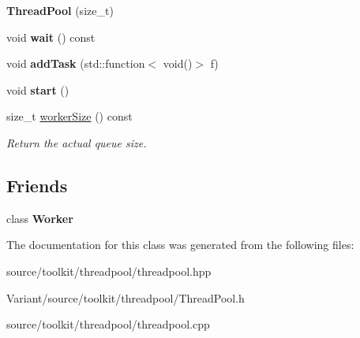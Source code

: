 \begin{DoxyCompactItemize}
\mbox{\label{classThreadPool_ac291710e33dbbed96ee20711080d506d}} 
{\bfseries Thread\+Pool} (size\+\_\+t)
\item 
\mbox{\label{classThreadPool_a8bc38c40ecf3916d28e1e721b4eaa3ac}} 
void {\bfseries wait} () const
\item 
\mbox{\label{classThreadPool_a2e9207443f99bdbebf0f4dd51e8efd69}} 
void {\bfseries add\+Task} (std\+::function$<$ void()$>$ f)
\item 
\mbox{\label{classThreadPool_a74e85ff1e6605531acdd8e0e3cf903df}} 
void {\bfseries start} ()
\item 
\mbox{\label{classThreadPool_acedf753fca0af3a8d23cea609273183c}} 
size\+\_\+t \hyperlink{classThreadPool_acedf753fca0af3a8d23cea609273183c}{worker\+Size} () const
\begin{DoxyCompactList}\small\item\em Return the actual queue size. \end{DoxyCompactList}\end{DoxyCompactItemize}
\subsection*{Friends}
\begin{DoxyCompactItemize}
\item 
\mbox{\label{classThreadPool_ae6071f2a70b19dd2d09379cddb8d6442}} 
class {\bfseries Worker}
\end{DoxyCompactItemize}


The documentation for this class was generated from the following files\+:\begin{DoxyCompactItemize}
\item 
source/toolkit/threadpool/threadpool.\+hpp\item 
Variant/source/toolkit/threadpool/Thread\+Pool.\+h\item 
source/toolkit/threadpool/threadpool.\+cpp\end{DoxyCompactItemize}
